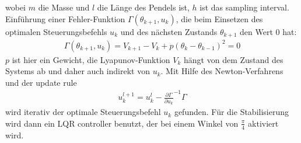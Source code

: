 wobei $m$ die Masse und $l$ die Länge des Pendels ist, $h$ ist das sampling interval. Einführung einer Fehler-Funktion $\Gamma(\theta_{k+1}, u_k)$, die beim Einsetzen des optimalen Steuerungsbefehls $u_k$ und des nächsten Zustands $\theta_{k+1}$ den Wert 0 hat:
\begin{align}
    \Gamma(\theta_{k+1}, u_k) = V_{k+1} - V_k + p(\theta_k - \theta_{k-1})^2 = 0
\end{align}
$p$ ist hier ein Gewicht, die Lyapunov-Funktion $V_k$ hängt von dem Zustand des Systems ab und daher auch indirekt von $u_k$. Mit Hilfe des Newton-Verfahrens und der update rule
\begin{align}
    u_{k}^{l+1} = u_k^l - \frac{\partial\Gamma}{\partial u_k}^{-1}\Gamma
\end{align}
wird iterativ der optimale Steuerungsbefehl $u_k$ gefunden. Für die Stabilisierung wird dann ein LQR controller benutzt, der bei einem Winkel von $\frac{\pi}{4}$ aktiviert wird.

